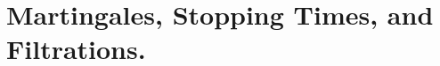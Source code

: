 \documentclass{report}
\begin{document}
\chapter{Martingales, Stopping Times, and Filtrations.}
\end{document}
